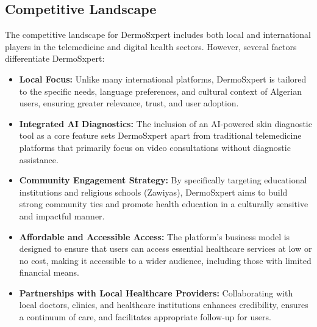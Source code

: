 \subsection{Competitive Landscape}
The competitive landscape for DermoSxpert includes both local and international players in the telemedicine and digital health sectors. However, several factors differentiate DermoSxpert:
\begin{itemize}
  \item \textbf{Local Focus:} Unlike many international platforms, DermoSxpert is tailored to the specific needs, language preferences, and cultural context of Algerian users, ensuring greater relevance, trust, and user adoption.
  \item \textbf{Integrated AI Diagnostics:} The inclusion of an AI-powered skin diagnostic tool as a core feature sets DermoSxpert apart from traditional telemedicine platforms that primarily focus on video consultations without diagnostic assistance.
  \item \textbf{Community Engagement Strategy:} By specifically targeting educational institutions and religious schools (Zawiyas), DermoSxpert aims to build strong community ties and promote health education in a culturally sensitive and impactful manner.
  \item \textbf{Affordable and Accessible Access:} The platform's business model is designed to ensure that users can access essential healthcare services at low or no cost, making it accessible to a wider audience, including those with limited financial means.
  \item \textbf{Partnerships with Local Healthcare Providers:} Collaborating with local doctors, clinics, and healthcare institutions enhances credibility, ensures a continuum of care, and facilitates appropriate follow-up for users.
\end{itemize}

